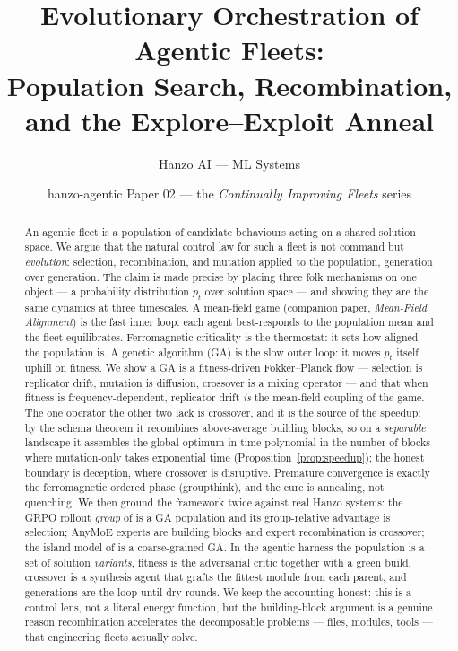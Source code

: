 \documentclass[11pt]{article}
\title{\textbf{Evolutionary Orchestration of Agentic Fleets:\\ Population Search, Recombination, and the Explore--Exploit Anneal}}
\author{Hanzo AI --- ML Systems}
\date{hanzo-agentic Paper 02 --- the \emph{Continually Improving Fleets} series}
\begin{document}
\maketitle

\begin{abstract}
An agentic fleet is a population of candidate behaviours acting on a shared solution space. We argue that
the natural control law for such a fleet is not command but \emph{evolution}: selection, recombination, and
mutation applied to the population, generation over generation. The claim is made precise by placing three
folk mechanisms on one object --- a probability distribution $p_t$ over solution space --- and showing they
are the same dynamics at three timescales. A mean-field game (companion paper,
\emph{Mean-Field Alignment}) is the fast inner loop: each agent best-responds to the population mean and the
fleet equilibrates. Ferromagnetic criticality is the thermostat: it sets how aligned the population is.
A genetic algorithm (GA) is the slow outer loop: it moves $p_t$ itself uphill on fitness. We show a GA is a
fitness-driven Fokker--Planck flow --- selection is replicator drift, mutation is diffusion, crossover is a
mixing operator --- and that when fitness is frequency-dependent, replicator drift \emph{is} the mean-field
coupling of the game. The one operator the other two lack is crossover, and it is the source of the speedup:
by the schema theorem it recombines above-average building blocks, so on a \emph{separable} landscape it
assembles the global optimum in time polynomial in the number of blocks where mutation-only takes
exponential time (Proposition~\ref{prop:speedup}); the honest boundary is deception, where crossover is
disruptive. Premature convergence is exactly the ferromagnetic ordered phase (groupthink), and the cure is
annealing, not quenching. We then ground the framework twice against real Hanzo systems: the GRPO rollout
\emph{group} of \cite{hanzo-native-training} is a GA population and its group-relative advantage is selection;
AnyMoE experts are building blocks and expert recombination is crossover; the island model of
\cite{hanzo-intrinsic-islands} is a coarse-grained GA. In the agentic harness the population is a set of
solution \emph{variants}, fitness is the adversarial critic together with a green build, crossover is a
synthesis agent that grafts the fittest module from each parent, and generations are the loop-until-dry
rounds. We keep the accounting honest: this is a control lens, not a literal energy function, but the
building-block argument is a genuine reason recombination accelerates the decomposable problems --- files,
modules, tools --- that engineering fleets actually solve.
\end{abstract}
\end{document}
